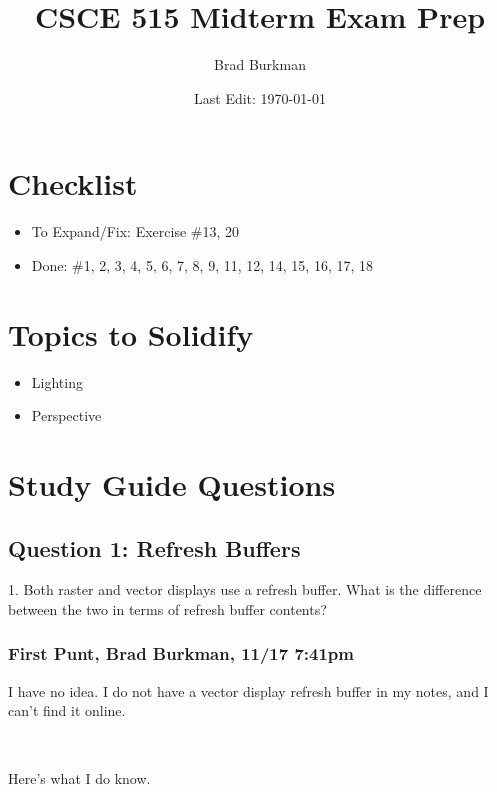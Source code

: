 \documentclass[11pt]{article}
\title{CSCE 515 Midterm Exam Prep}
\author{Brad Burkman}
\date{Last Edit: \today}
\begin{document}
\setlength{\parindent}{20pt}
\begin{spacing}{1.2}
\maketitle

\section{Checklist}

\begin{itemize}
	\item To Expand/Fix:  Exercise \#13, 20
	\item Done:  \#1, 2, 3,  4, 5, 6, 7, 8, 9, 11, 12, 14, 15, 16, 17, 18
\end{itemize}

\section{Topics to Solidify}

\begin{itemize}
	\item Lighting
	\item Perspective
\end{itemize}

\tableofcontents

\section{Study Guide Questions}

\subsection{Question 1:  Refresh Buffers}
1.  Both raster and vector displays use a refresh buffer.  What is the difference between the two in terms of refresh buffer contents?

\subsubsection{First Punt, Brad Burkman, 11/17 7:41pm}

I have no idea.  I do not have a vector display refresh buffer in my notes, and I can't find it online.  

\

Here's what I do know.  

\


\end{spacing}
\end{document}
